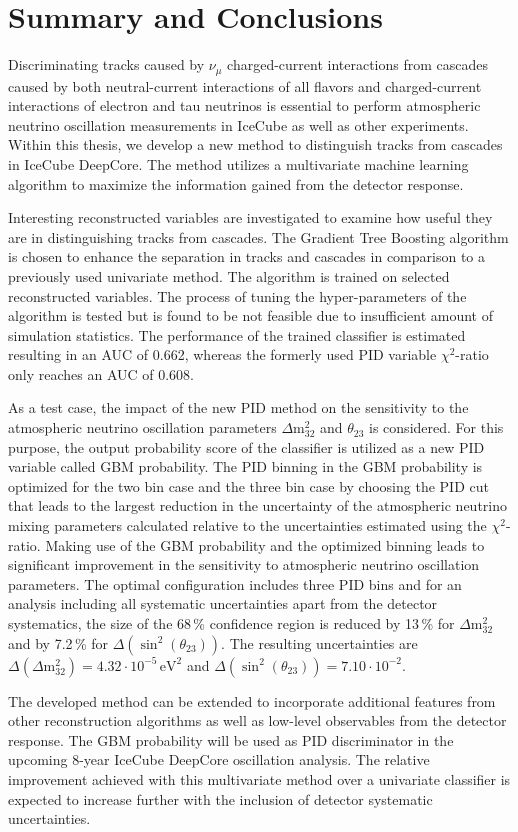\chapter{Summary and Conclusions} \label{chap:summary}

Discriminating tracks caused by $\nu_\mu$ charged-current interactions from cascades caused by both neutral-current interactions of all flavors and charged-current interactions of electron and tau neutrinos is essential to perform atmospheric neutrino oscillation measurements in IceCube as well as other experiments.
Within this thesis, we develop a new method to distinguish tracks from cascades in IceCube DeepCore.
The method utilizes a multivariate machine learning algorithm to maximize the information gained from the detector response.

Interesting reconstructed variables are investigated to examine how useful they are in distinguishing tracks from cascades.
The Gradient Tree Boosting algorithm is chosen to enhance the separation in tracks and cascades in comparison to a previously used univariate method.
The algorithm is trained on selected reconstructed variables. The process of tuning the hyper-parameters of the algorithm is tested but is found to be not feasible due to insufficient amount of simulation statistics.
The performance of the trained classifier is estimated resulting in an AUC of 0.662, whereas the formerly used PID variable $\chi^2$-ratio only reaches an AUC of 0.608.

As a test case, the impact of the new PID method on the sensitivity to the atmospheric neutrino oscillation parameters $\Delta \mathrm{m}^{2}_{32}$ and $\theta_{23}$ is considered.
For this purpose, the output probability score of the classifier is utilized as a new PID variable called GBM probability.
The PID binning in the GBM probability is optimized for the two bin case and the three bin case by choosing the PID cut that leads to the largest reduction in the uncertainty of the atmospheric neutrino mixing parameters calculated relative to the uncertainties estimated using the $\chi^2$-ratio.
Making use of the GBM probability and the optimized binning leads to significant improvement in the sensitivity to atmospheric neutrino oscillation parameters.
The optimal configuration includes three PID bins and for an analysis including all systematic uncertainties apart from the detector systematics, the size of the 68\,\% confidence region is reduced by 13\,\% for $\Delta \mathrm{m}^{2}_{32}$ and by 7.2\,\% for $\Delta(\sin^{2}(\theta_{23}))$.
The resulting uncertainties are $\Delta(\Delta \mathrm{m}^{2}_{32}) = 4.32\cdot10^{-5}\,\mathrm{eV}^2$ and $\Delta(\sin^{2}(\theta_{23})) = 7.10\cdot10^{-2}$.

The developed method can be extended to incorporate additional features from other reconstruction algorithms as well as low-level observables from the detector response.
The GBM probability will be used as PID discriminator in the upcoming 8-year IceCube DeepCore oscillation analysis.
The relative improvement achieved with this multivariate method over a univariate classifier is expected to increase further with the inclusion of detector systematic uncertainties.